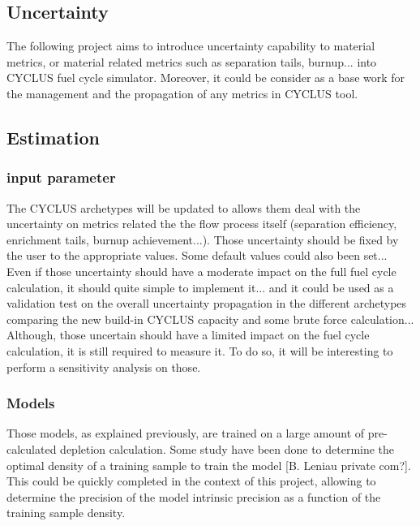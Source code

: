\documentclass[dvips,12pt]{article}
\begin{document}
\subsection{Uncertainty}
The following project aims to introduce uncertainty capability to material metrics, or material related metrics such as separation tails, burnup...  into CYCLUS fuel cycle simulator. Moreover, it could be consider as a base work for the management and the propagation of any metrics in CYCLUS tool.




\subsection{Estimation}
\subsubsection{input parameter}
The CYCLUS archetypes will be updated to allows them deal with the uncertainty on metrics related the the flow process itself (separation efficiency, enrichment tails, burnup achievement...). Those uncertainty should be fixed by the user to the appropriate values. Some default values could also been set...\\
Even if those uncertainty should have a moderate impact on the full fuel cycle calculation, it should quite simple to implement it... and it could be used as a validation test on the overall uncertainty propagation in the different archetypes comparing the new build-in CYCLUS capacity and some brute force calculation...\\
Although, those uncertain should have a limited impact on the fuel cycle calculation, it is still required to measure it. To do so, it will be interesting to perform a sensitivity analysis on those.




\subsubsection{Models}
Those models, as explained previously, are trained on a large amount of pre-calculated depletion calculation. Some study have been done to determine the optimal density of a training sample to train the model [B. Leniau private com?]. This could be quickly completed in the context of this project, allowing to determine the precision of the model intrinsic precision as a function of the training sample density.\\
\end{document}
